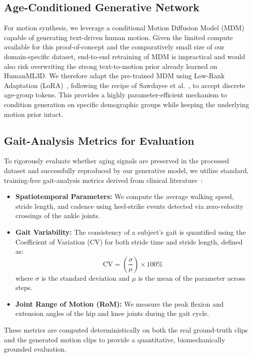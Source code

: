 \subsection{Age-Conditioned Generative Network}

For motion synthesis, we leverage a conditional Motion Diffusion Model (MDM)~\cite{tevet2023human} capable of generating text-driven human motion.
Given the limited compute available for this proof-of-concept and the comparatively small size of our domain-specific dataset, end-to-end retraining of MDM is impractical and would also risk overwriting the strong text-to-motion prior already learned on HumanML3D.
We therefore adapt the pre-trained MDM using Low-Rank Adaptation (LoRA)~\cite{hu2022lora}, following the recipe of Sawdayee et al.~\cite{sawdayee2025dance}, to accept discrete age-group tokens. This provides a highly parameter-efficient mechanism to condition generation on specific demographic groups while keeping the underlying motion prior intact.

\subsection{Gait-Analysis Metrics for Evaluation}

To rigorously evaluate whether aging signals are preserved in the processed dataset and successfully reproduced by our generative model, we utilize standard, training-free gait-analysis metrics derived from clinical literature~\cite{bailey2023smartwatch, galasso2024development}:

\begin{itemize}
    \item \textbf{Spatiotemporal Parameters:} We compute the average walking speed, stride length, and cadence using heel-strike events detected via zero-velocity crossings of the ankle joints.
    \item \textbf{Gait Variability:} The consistency of a subject's gait is quantified using the Coefficient of Variation (CV) for both stride time and stride length, defined as:
    \begin{equation}
        \mathrm{CV} = \left( \frac{\sigma}{\mu} \right) \times 100\%
    \end{equation}
    where $\sigma$ is the standard deviation and $\mu$ is the mean of the parameter across steps.
    \item \textbf{Joint Range of Motion (RoM):} We measure the peak flexion and extension angles of the hip and knee joints during the gait cycle.
\end{itemize}

These metrics are computed deterministically on both the real ground-truth clips and the generated motion clips to provide a quantitative, biomechanically grounded evaluation.
